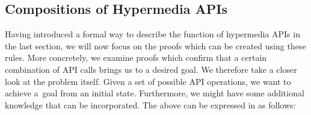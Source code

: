 % 
% 

\subsection{Compositions of Hypermedia APIs}
\label{subsec:Definition}
Having introduced a formal way to describe the function of hypermedia APIs in the last section,
we will now focus on the proofs which can be created using these rules.
More concretely, we examine proofs which confirm that a certain combination of API calls brings us to a desired goal.
We therefore take a closer look at the problem itself.
Given a set of possible API operations,
we want to achieve a~goal from an initial state.
Furthermore, we might have some additional knowledge that can be incorporated.
The above can be expressed in \nthree as follows:

